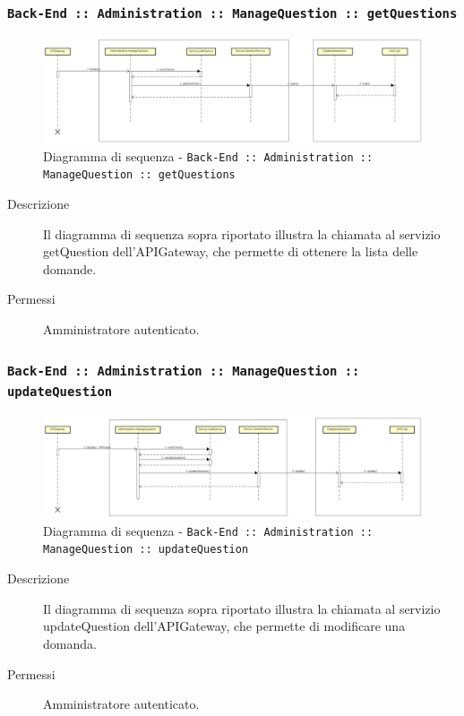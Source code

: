 \documentclass[../DefinizioneDiProdotto_v2.0.0.tex]{subfiles}
\begin{document}
\newpage
\subsubsection{\texttt{Back-End :: Administration :: ManageQuestion :: getQuestions}}
\begin{figure}[!h]
	\centering
	\includegraphics[scale=0.3]{DiagrammiSequenza/Back-End/manageQuestion/getQuestion.png}
	\caption{Diagramma di sequenza - \texttt{Back-End :: Administration :: ManageQuestion :: getQuestions }}
\end{figure}
\begin{description}
	\item [Descrizione] Il diagramma di sequenza sopra riportato illustra la chiamata al servizio getQuestion dell'APIGateway, che permette di ottenere la lista delle domande.
	\item [Permessi] Amministratore autenticato.
\end{description}

\subsubsection{\texttt{Back-End :: Administration :: ManageQuestion :: updateQuestion}}
\begin{figure}[!h]
	\centering
	\includegraphics[scale=0.3]{DiagrammiSequenza/Back-End/manageQuestion/updateQuestion.png}
	\caption{Diagramma di sequenza - \texttt{Back-End :: Administration :: ManageQuestion :: updateQuestion} }
\end{figure}
\begin{description}
	\item [Descrizione] Il diagramma di sequenza sopra riportato illustra la chiamata al servizio updateQuestion dell'APIGateway, che permette di modificare una domanda.
	\item [Permessi] Amministratore autenticato.
\end{description}
\end{document}
